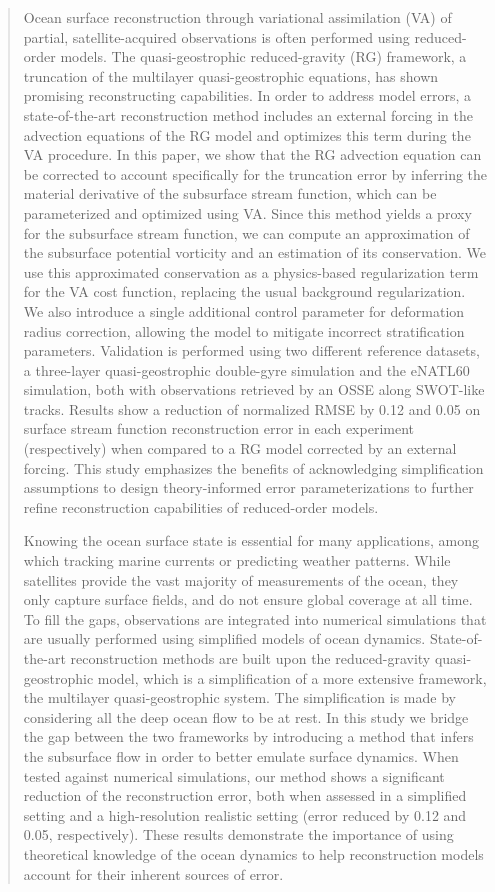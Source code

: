 \documentclass[
  draft
]{agujournal2025}
\begin{document}
\begin{abstract}
    Ocean surface reconstruction through variational assimilation (VA) of partial, satellite-acquired observations is often performed using reduced-order models. 
    The quasi-geostrophic reduced-gravity (RG) framework, a truncation of the multilayer quasi-geostrophic equations, has shown promising reconstructing capabilities.
    In order to address model errors, a state-of-the-art reconstruction method includes an external forcing in the advection equations of the RG model and optimizes this term during the VA procedure.
    In this paper, we show that the RG advection equation can be corrected to account specifically for the truncation error by inferring the material derivative of the subsurface stream function, which can be parameterized and optimized using VA.
    Since this method yields a proxy for the subsurface stream function, we can compute an approximation of the subsurface potential vorticity and an estimation of its conservation.
    We use this approximated conservation as a physics-based regularization term for the VA cost function, replacing the usual background regularization.
    We also introduce a single additional control parameter for deformation radius correction, allowing the model to mitigate incorrect stratification parameters.
    Validation is performed using two different reference datasets, a three-layer quasi-geostrophic double-gyre simulation and the eNATL60 simulation, both with observations retrieved by an OSSE along SWOT-like tracks.
    Results show a reduction of normalized RMSE by 0.12 and 0.05 on surface stream function reconstruction error in each experiment (respectively) when compared to a RG model corrected by an external forcing.
    This study emphasizes the benefits of acknowledging simplification assumptions to design theory-informed error parameterizations to further refine reconstruction capabilities of reduced-order models.
    \begin{plainlanguagesummary}
        Knowing the ocean surface state is essential for many applications, among which tracking marine currents or predicting weather patterns. While satellites provide the vast majority of measurements of the ocean, they only capture surface fields, and do not ensure global coverage at all time. To fill the gaps, observations are integrated into numerical simulations that are usually performed using simplified models of ocean dynamics. State-of-the-art reconstruction methods are built upon the reduced-gravity quasi-geostrophic model, which is a simplification of a more extensive framework, the multilayer quasi-geostrophic system. The simplification is made by considering all the deep ocean flow to be at rest. In this study we bridge the gap between the two frameworks by introducing a method that infers the subsurface flow in order to better emulate surface dynamics. When tested against numerical simulations, our method shows a significant reduction of the reconstruction error, both when assessed in a simplified setting and a high-resolution realistic setting (error reduced by 0.12 and 0.05, respectively). These results demonstrate the importance of using theoretical knowledge of the ocean dynamics to help reconstruction models account for their inherent sources of error.

\end{plainlanguagesummary}
\end{abstract}
\end{document}
